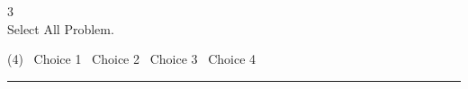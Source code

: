 \begin{question}[class=Z]{3}
  \SelectAllInstructions \\[0.1in]

  Select All Problem.
  \begin{tasks}(4)
    \task[\selectall] \ Choice 1
    \task[\correctselectall] \ Choice 2
    \task[\selectall] \ Choice 3
    \task[\selectall] \ Choice 4
  \end{tasks}
\end{question}

\noindent\rule{\textwidth}{1pt}
